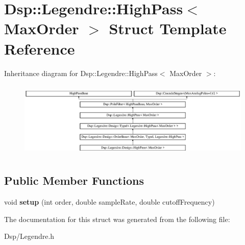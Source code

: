 \hypertarget{structDsp_1_1Legendre_1_1HighPass}{\section{Dsp\-:\-:Legendre\-:\-:High\-Pass$<$ Max\-Order $>$ Struct Template Reference}
\label{structDsp_1_1Legendre_1_1HighPass}
}
Inheritance diagram for Dsp\-:\-:Legendre\-:\-:High\-Pass$<$ Max\-Order $>$\-:\begin{figure}[H]
\begin{center}
\leavevmode
\includegraphics[height=3.660131cm]{structDsp_1_1Legendre_1_1HighPass}
\end{center}
\end{figure}
\subsection*{Public Member Functions}
\begin{DoxyCompactItemize}
\item 
\hypertarget{structDsp_1_1Legendre_1_1HighPass_a00967d7b58efba60f918fdd3c208e76c}{void {\bfseries setup} (int order, double sample\-Rate, double cutoff\-Frequency)}\label{structDsp_1_1Legendre_1_1HighPass_a00967d7b58efba60f918fdd3c208e76c}

\end{DoxyCompactItemize}


The documentation for this struct was generated from the following file\-:\begin{DoxyCompactItemize}
\item 
Dsp/Legendre.\-h\end{DoxyCompactItemize}
